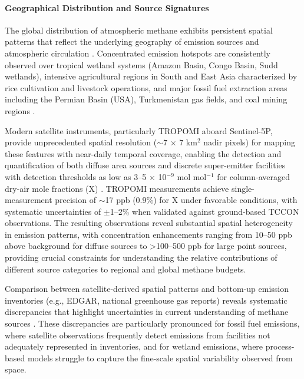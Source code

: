 \paragraph{Geographical Distribution and Source Signatures}
The global distribution of atmospheric methane exhibits persistent spatial patterns that reflect the underlying geography of emission sources and atmospheric circulation \cite{Zhang2020}. Concentrated emission hotspots are consistently observed over tropical wetland systems (Amazon Basin, Congo Basin, Sudd wetlands), intensive agricultural regions in South and East Asia characterized by rice cultivation and livestock operations, and major fossil fuel extraction areas including the Permian Basin (USA), Turkmenistan gas fields, and coal mining regions \cite{irakulis_loitxate_satellites_2022}.

Modern satellite instruments, particularly TROPOMI aboard Sentinel-5P, provide unprecedented spatial resolution ($\sim$7 $\times$ 7 km$^2$ nadir pixels) for mapping these features with near-daily temporal coverage, enabling the detection and quantification of both diffuse area sources and discrete super-emitter facilities with detection thresholds as low as 3--5 $\times$ 10$^{-9}$ mol mol$^{-1}$ for column-averaged dry-air mole fractions (X) \cite{Jacob2022, Lorente2021}. TROPOMI measurements achieve single-measurement precision of $\sim$17 ppb (0.9\%) for X under favorable conditions, with systematic uncertainties of $\pm$1--2\% when validated against ground-based TCCON observations. The resulting observations reveal substantial spatial heterogeneity in emission patterns, with concentration enhancements ranging from 10--50 ppb above background for diffuse sources to >100--500 ppb for large point sources, providing crucial constraints for understanding the relative contributions of different source categories to regional and global methane budgets.

Comparison between satellite-derived spatial patterns and bottom-up emission inventories (e.g., EDGAR, national greenhouse gas reports) reveals systematic discrepancies that highlight uncertainties in current understanding of methane sources \cite{Saunois2020}. These discrepancies are particularly pronounced for fossil fuel emissions, where satellite observations frequently detect emissions from facilities not adequately represented in inventories, and for wetland emissions, where process-based models struggle to capture the fine-scale spatial variability observed from space.


